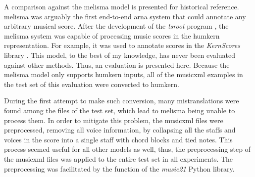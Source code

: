 
A comparison against the \gls{melisma} model is presented
for historical reference. \gls{melisma} was arguably the
first end-to-end \gls{arna} system that could annotate any
arbitrary musical score. After the development of the
\emph{tsroot} program \parencite{sapp2009tsroot}, the
\gls{melisma} system was capable of processing music scores
in the \gls{humkern} representation. For example, it was
used to annotate scores in the \emph{KernScores} library
\parencite{sapp2005online}. This model, to the best of my
knowledge, has never been evaluated against other methods.
Thus, an evaluation is presented here. Because the
\gls{melisma} model only supports \gls{humkern} inputs, all
of the \gls{musicxml} examples in the test set of this
evaluation were converted to \gls{humkern}. 

During the first attempt to make such conversion, many
mistranslations were found among the files of the test set,
which lead to \gls{melisma} being unable to process them. In
order to mitigate this problem, the \gls{musicxml} files
were preprocessed, removing all voice information, by
collapsing all the staffs and voices in the score into a
single staff with chord blocks and tied notes. This process
seemed useful for all other models as well, thus, the
preprocessing step of the \gls{musicxml} files was applied
to the entire test set in all experiments. The preprocessing
was facilitated by the  function of the
\emph{music21} Python library.




    

